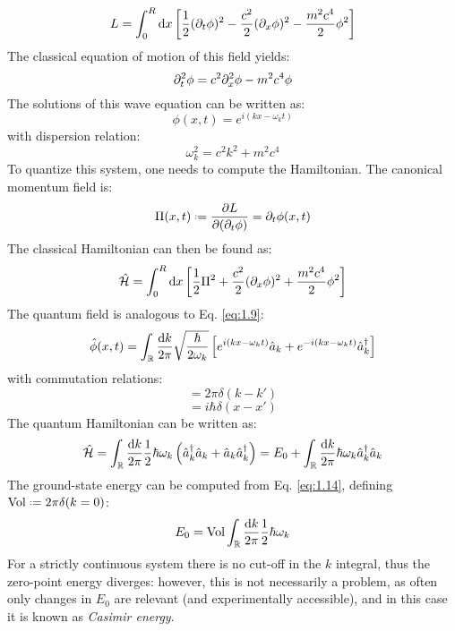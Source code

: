 \begin{equation}
  L = \int_0^R \mathrm{d} x \left[ \frac{1}{2} (\partial_t \phi)^2 - \frac{c^2}{2} (\partial_x \phi)^2 - \frac{m^2 c^4}{2} \phi^2 \right]
  \label{eq:1.16}
\end{equation}
The classical equation of motion of this field yields:
\begin{equation}
  \partial_t^2 \phi = c^2 \partial_x^2 \phi - m^2 c^4 \phi
  \label{eq:1.17}
\end{equation}
The solutions of this wave equation can be written as:
\begin{equation}
  \phi(x,t) = e^{i \left( kx - \omega_k t \right)}
  \label{eq:1.18}
\end{equation}
with dispersion relation:
\begin{equation}
  \omega_k^2 = c^2 k^2 + m^2 c^4
  \label{eq:1.19}
\end{equation}
To quantize this system, one needs to compute the Hamiltonian. The canonical momentum field is:
\begin{equation}
  \Pi(x,t) \defeq \frac{\pa L}{\pa (\pa_t \phi)} = \pa_t \phi(x,t)
  \label{eq:1.20}
\end{equation}
The classical Hamiltonian can then be found as:
\begin{equation}
  \hat{\mathcal{H}} = \int_0^R \mathrm{d} x \left[ \frac{1}{2} \Pi^2 + \frac{c^2}{2} (\partial_x \phi)^2 + \frac{m^2 c^4}{2} \phi^2 \right]
  \label{eq:1.21}
\end{equation}
The quantum field is analogous to Eq. \ref{eq:1.9}:
\begin{equation}
  \hat\phi(x,t) = \int_{\mathbb{R}} \frac{\mathrm{d} k}{2\pi} \sqrt{\frac{\hbar}{2\omega_k}} \left[ e^{i \left( kx - \omega_k t \right)} \hat{a}_k + e^{-i \left( kx - \omega_k t \right)} \hat{a}_k^\dagger \right]
  \label{eq:1.22}
\end{equation}
with commutation relations:
\begin{equation}
  [\hat{a}_k, \hat{a}_{k'}^\dagger] = 2\pi \delta(k - k')
  \label{eq:1.23}
\end{equation}
\begin{equation}
  [\hat\phi(x,t), \hat\Pi(x',t)] = i\hbar \delta(x - x')
  \label{eq:1.24}
\end{equation}
The quantum Hamiltonian can be written as:
\begin{equation}
  \hat{\mathcal{H}} = \int_{\mathbb{R}} \frac{\mathrm{d} k}{2\pi} \frac{1}{2} \hbar \omega_k \left( \hat{a}_k^\dagger \hat{a}_k + \hat{a}_k \hat{a}_k^\dagger \right) = E_0 + \int_{\mathbb{R}} \frac{\mathrm{d} k}{2\pi} \hbar \omega_k \hat{a}_k^\dagger \hat{a}_k
  \label{eq:1.25}
\end{equation}
The ground-state energy can be computed from Eq. \ref{eq:1.14}, defining $ \mathrm{Vol} \defeq 2\pi \delta(k = 0) $:
\begin{equation}
  E_0 = \mathrm{Vol} \int_{\mathbb{R}} \frac{\mathrm{d} k}{2\pi} \frac{1}{2} \hbar \omega_k
  \label{eq:1.26}
\end{equation}
For a strictly continuous system there is no cut-off in the $ k $ integral, thus the zero-point energy diverges: however, this is not necessarily a problem, as often only changes in $ E_0 $ are relevant (and experimentally accessible), and in this case it is known as \textit{Casimir energy}.


